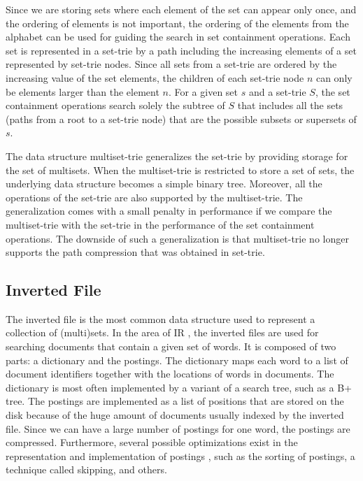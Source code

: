 \documentclass[algorithms,article,accept,pdftex,moreauthors]{Definitions/mdpi}
\begin{document}
Since we are storing sets where each element of the set can appear only once, and the ordering of elements is not important, the ordering of the elements from the alphabet can be used for guiding the search in set containment operations. Each set is represented in a set-trie by a path including the increasing elements of a set represented by set-trie nodes. Since all sets from a set-trie are ordered by the increasing value of the set elements, the children of each set-trie node $n$ can only be elements larger than the element $n$. For a given set $s$ and a set-trie $S$, the set containment operations search solely the subtree of $S$ that includes all the sets (paths from a root to a set-trie node) that are the possible subsets or supersets of $s$.

The data structure multiset-trie generalizes the set-trie by providing storage for the set of multisets. When the multiset-trie is restricted to store a set of sets, the underlying data structure becomes a simple binary tree. Moreover, all the operations of the set-trie are also supported by the multiset-trie. The generalization comes with a small penalty in performance if we compare the multiset-trie with the set-trie in the performance of the set containment operations. The downside of such a generalization is that multiset-trie no longer supports the path compression that was obtained in set-trie. 

\subsection{Inverted File\label{rel-invfile}}

The inverted file \cite{zobel1992efficient,zobel1998inverted,zobel2006inverted} is the most common data structure used to represent a collection of (multi)sets. In the area of IR \cite{manning2008introduction}, the inverted files are used for searching documents that contain a given set of words. It is composed of two parts: a dictionary and the postings. The dictionary maps each word to a list of document identifiers together with the locations of words in documents. The dictionary is most often implemented by a variant of a search tree, such as a B+ tree. The postings are implemented as a list of positions that are stored on the disk because of the huge amount of documents usually indexed by the inverted file. Since we can have a large number of postings for one word, the postings are compressed. Furthermore, several possible optimizations exist in the representation and implementation of postings \cite{zobel2006inverted}, such as the sorting of postings, a technique called skipping, and others.
\end{document}
